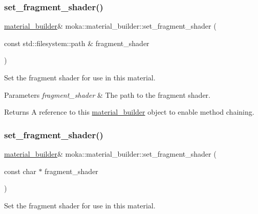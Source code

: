 \subsubsection{\texorpdfstring{set\_fragment\_shader()}{set\_fragment\_shader()}\hspace{0.1cm}{\footnotesize\ttfamily [1/3]}}
{\footnotesize\ttfamily \mbox{\hyperlink{classmoka_1_1material__builder}{material\+\_\+builder}}\& moka\+::material\+\_\+builder\+::set\+\_\+fragment\+\_\+shader (\begin{DoxyParamCaption}\item[{const std\+::filesystem\+::path \&}]{fragment\+\_\+shader }\end{DoxyParamCaption})}



Set the fragment shader for use in this material. 


\begin{DoxyParams}{Parameters}
{\em fragment\+\_\+shader} & The path to the fragment shader. \\
\hline
\end{DoxyParams}
\begin{DoxyReturn}{Returns}
A reference to this \mbox{\hyperlink{classmoka_1_1material__builder}{material\+\_\+builder}} object to enable method chaining. 
\end{DoxyReturn}
\mbox{\label{classmoka_1_1material__builder_ad6470a4af986c3c6bc83226cbaa73be3}} 
\subsubsection{\texorpdfstring{set\_fragment\_shader()}{set\_fragment\_shader()}\hspace{0.1cm}{\footnotesize\ttfamily [2/3]}}
{\footnotesize\ttfamily \mbox{\hyperlink{classmoka_1_1material__builder}{material\+\_\+builder}}\& moka\+::material\+\_\+builder\+::set\+\_\+fragment\+\_\+shader (\begin{DoxyParamCaption}\item[{const char $\ast$}]{fragment\+\_\+shader }\end{DoxyParamCaption})}



Set the fragment shader for use in this material. 



